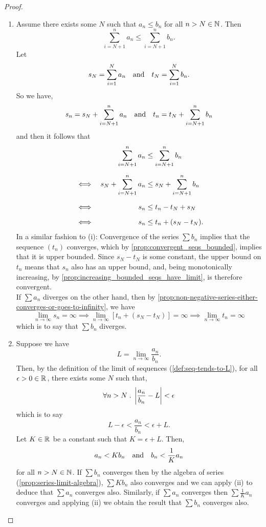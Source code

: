 \documentclass[../MathsNotesBase.tex]{subfiles}
\begin{document}
{\begin{proof}
\begin{enumerate}[label=(\roman*)]
					\[ \lim_{n \to \infty} t_n = \sup \setc{t_n}{n \in \N{}} \leq \sup \setc{s_n}{n \in \N{}} = \lim_{n \to \infty} s_n. \]
					\nl
					If, on the other hand, ${ \sum a_n }$ diverges, by the increasing property and \autoref{prop:non-negative-series-either-converges-or-goes-to-infinity}, it must go to infinity (which is to say that the partial sums $s_n$ go to infinity). Therefore, the partial sums $t_n$ must also go to infinity and so, by definition, ${ \sum b_n }$ diverges also.
				\bigskip
				\item Assume there exists some $N$ such that ${ a_n \leq b_n }$ for all ${ n > N \in \mathbb{N}^{} }$. Then
					\[ \sum_{i=N+1}^n a_n \leq \sum_{i=N+1}^n b_n. \]
					Let
					\[ s_N = \sum_{i=1}^N a_n \hspace{10pt}\text{and}\hspace{10pt} t_N = \sum_{i=1}^N b_n. \]
					So we have,
					\[ s_n = s_N + \sum_{i=N+1}^n a_n \hspace{10pt}\text{and}\hspace{10pt} t_n = t_N + \sum_{i=N+1}^n b_n \]
					and then it follows that
					\[\begin{aligned}
						&& \sum_{i=N+1}^n a_n &\leq \sum_{i=N+1}^n b_n \nn
						&\iff & s_N + \sum_{i=N+1}^n a_n &\leq s_N + \sum_{i=N+1}^n b_n \nn
						&\iff & s_n &\leq t_n - t_N + s_N \nn
						&\iff & s_n &\leq t_n + (s_N - t_N).
					\end{aligned}\]
					In a similar fashion to (i): Convergence of the series $\sum b_n$ implies that the sequence $(t_n)$ converges, which by \autoref{prop:convergent_seqs_bounded}, implies that it is upper bounded. Since ${ s_N - t_N }$ is some constant, the upper bound on $t_n$ means that $s_n$ also has an upper bound, and, being monotonically increasing, by \autoref{prop:increasing_bounded_seqs_have_limit}, is therefore convergent.\\
					
					If ${ \sum a_n }$ diverges on the other hand, then by \autoref{prop:non-negative-series-either-converges-or-goes-to-infinity}, we have
					\[ \lim_{n \to \infty} s_n = \infty \implies \lim_{n \to \infty} [t_n + (s_N - t_N)] = \infty \implies \lim_{n \to \infty} t_n = \infty \]
					which is to say that ${ \sum b_n }$ diverges.
				\bigskip
				\item Suppose we have
					\[ L = \lim_{n \to \infty} \frac{a_n}{b_n}. \]
					Then, by the definition of the limit of sequences (\ref{def:seq-tends-to-L}), for all ${ \epsilon > 0 \in \mathbb{R}^{} }$, there exists some $N$ such that,
					\[ \forall n > N \;.\; \left\lvert\frac{a_n}{b_n} - L\right\rvert < \epsilon \]
					which is to say
					\[ L - \epsilon < \frac{a_n}{b_n} < \epsilon + L. \]
					Let ${ K \in \mathbb{R}^{} }$ be a constant such that ${ K = \epsilon + L }$. Then,
					\[ a_n < K b_n \hspace{10pt}\text{and}\hspace{10pt} b_n < \frac{1}{K} a_n \]
					for all ${ n > N \in \mathbb{N}^{} }$. If ${ \sum b_n }$ converges then by the algebra of series (\autoref{prop:series-limit-algebra}), ${ \sum K b_n }$ also converges and we can apply (ii) to deduce that ${ \sum a_n }$ converges also. Similarly, if ${ \sum a_n }$ converges then ${ \sum \frac{1}{K} a_n }$ converges and applying (ii) we obtain the result that ${ \sum b_n }$ converges also.
			\end{enumerate}
		\end{proof}
	
}
\end{document}
